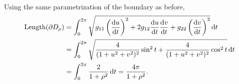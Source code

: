 \documentclass[a4paper,12pt]{article}
\theoremstyle{remark}
\begin{document}
\begin{enumerate}
\begin{enumerate}
\begin{align*}
                \end{align*}
                Using the same parametrization of the boundary as before,
                \begin{align*}
                    \text{Length}(\partial D_\rho) &= \int_0^{2\pi} \sqrt{ g_{11} \left( \dv{u}{t} \right)^2 + 2g_{12} \dv{u}{t} \dv{v}{t} + g_{22} \left( \dv{v}{t} \right)^2 } \dd{t} \\
                    &= \int_0^{2\pi} \sqrt{ \frac{4}{(1 + u^2 + v^2)^2}\sin^2 t + \frac{4}{(1 + u^2 + v^2)^2}\cos^2 t } \dd{t} \\
                    &= \int_0^{2\pi} \frac{2}{1 + \rho^2} \dd{t} = \frac{4\pi}{1 + \rho^2}.
                \end{align*}
        \end{enumerate}


\end{enumerate}
\end{document}
